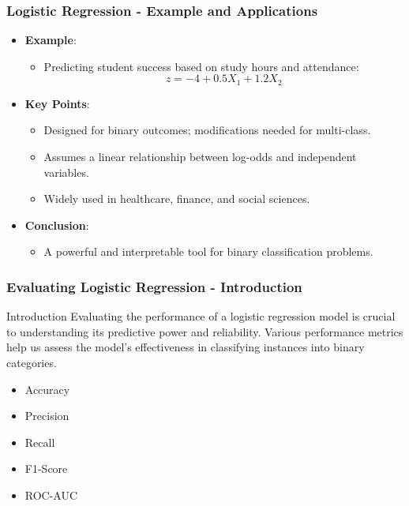 \documentclass[aspectratio=169]{beamer}
\begin{document}
\begin{frame}[fragile]
    \frametitle{Logistic Regression - Example and Applications}
    \begin{itemize}
        \item \textbf{Example}:
        \begin{itemize}
            \item Predicting student success based on study hours and attendance:
            \[
            z = -4 + 0.5X_1 + 1.2X_2
            \]
        \end{itemize}
        
        \item \textbf{Key Points}:
        \begin{itemize}
            \item Designed for binary outcomes; modifications needed for multi-class.
            \item Assumes a linear relationship between log-odds and independent variables.
            \item Widely used in healthcare, finance, and social sciences.
        \end{itemize}
        
        \item \textbf{Conclusion}:
        \begin{itemize}
            \item A powerful and interpretable tool for binary classification problems.
        \end{itemize}
    \end{itemize}
\end{frame}

\begin{frame}[fragile]
    \frametitle{Evaluating Logistic Regression - Introduction}
    \begin{block}{Introduction}
        Evaluating the performance of a logistic regression model is crucial to understanding its predictive power and reliability. Various performance metrics help us assess the model's effectiveness in classifying instances into binary categories.
    \end{block}
    \begin{itemize}
        \item Accuracy
        \item Precision
        \item Recall
        \item F1-Score
        \item ROC-AUC
    \end{itemize}
\end{frame}
\end{document}
